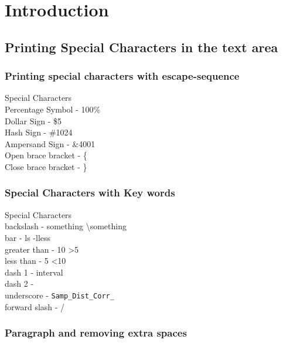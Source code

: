 \chapter{Introduction}
\section{Printing Special Characters in the text area}
\subsection{Printing special characters with escape-sequence}
 Special Characters \\ %
  Percentage Symbol - 100\%  \\ %
  Dollar Sign - \$5 \\
  Hash Sign - \#1024  \\
  Ampersand Sign - \&4001   \\
  Open brace bracket - \{  \\
  Close brace bracket - \}  \\
 


\subsection{Special Characters with Key words}
 Special Characters \\ %
  backslash  - something \textbackslash something \\
  bar        - ls -l\textbar less \\
  greater than -  10 \textgreater 5 \\
  less than -  5 \textless 10 \\
  dash 1 - inter\textendash val \\
  dash 2   -  \textemdash \\
  underscore -  \verb|Samp_Dist_Corr_| \\
  forward slash   - /
  
\subsection{Paragraph and removing extra spaces}

